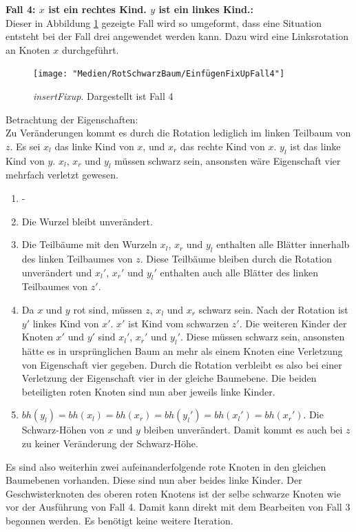 \documentclass[a4paper,12pt]{article}
\begin{document}
\noindent\textbf{Fall 4: $x$ ist ein rechtes Kind. $y$ ist ein linkes Kind.: }\\      
Dieser in Abbildung \ref{fig:EinfügenFixUpFall4} gezeigte Fall wird so umgeformt, dass eine Situation entsteht bei der Fall drei angewendet werden kann. Dazu wird eine Linksrotation an Knoten $x$ durchgeführt.\\
\begin{figure}[H]
	\centering
	\texttt{[image: "Medien/RotSchwarzBaum/EinfügenFixUpFall4"]}
	\caption{\textit{insertFixup}. Dargestellt ist Fall 4  }
	\label{fig:EinfügenFixUpFall4}
\end{figure}
\noindent Betrachtung der Eigenschaften:\\
Zu Veränderungen kommt es durch die Rotation lediglich im linken Teilbaum von $z$. Es sei $x_l$ das linke Kind von $x$,  und $x_r$ das rechte Kind von $x$. $y_l$ ist das linke Kind von $y$. $x_l$, $x_r$ und $y_l$ müssen schwarz sein, ansonsten wäre Eigenschaft vier mehrfach verletzt gewesen.
\begin{enumerate}
	\item -
	\item Die Wurzel bleibt unverändert.
	\item  Die Teilbäume mit den Wurzeln $x_l$, $x_r$ und $y_l$ enthalten alle Blätter innerhalb des linken Teilbaumes von $z$. Diese Teilbäume bleiben durch die Rotation unverändert und ${x_l}'$, ${x_r}'$ und ${y_l}'$ enthalten auch alle Blätter des linken Teilbaumes von $z'$.
	\item Da $x$ und $y$ rot sind, müssen $z$, $x_l$ und $x_r$ schwarz sein. Nach der Rotation ist $y'$ linkes Kind von $x'$. $x'$ ist Kind vom schwarzen $z'$. Die weiteren Kinder der Knoten $x'$ und $y'$ sind ${x_l}'$, ${x_r}'$ und ${y_l}'$. Diese müssen schwarz sein, ansonsten hätte es in ursprünglichen Baum an mehr als einem Knoten eine Verletzung von Eigenschaft vier gegeben. Durch die Rotation verbleibt es also bei einer Verletzung der Eigenschaft vier in der gleiche Baumebene. Die beiden beteiligten roten Knoten sind nun aber jeweils linke Kinder.   
	\item $ \mathit{bh(y_l)} = \mathit{bh(x_l)} = \mathit{bh(x_r)} = \mathit{bh({y_l}')} = \mathit{bh({x_l}')} = \mathit{bh({x_r}')} $. Die Schwarz-Höhen von $x$ und $y$ bleiben unverändert. Damit kommt es auch bei $z$ zu keiner Veränderung der Schwarz-Höhe. 
\end{enumerate}  

\noindent Es sind also weiterhin zwei aufeinanderfolgende rote Knoten in den gleichen Baumebenen vorhanden. Diese sind nun aber beides linke Kinder. Der Geschwisterknoten des oberen roten Knotens ist der selbe schwarze Knoten wie vor der Ausführung von Fall 4. Damit kann direkt mit dem Bearbeiten von Fall 3 begonnen werden. Es benötigt keine weitere Iteration.\\
\end{document}
